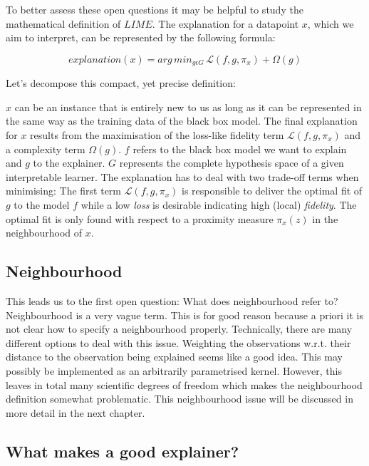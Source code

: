 \documentclass[]{krantz}
\begin{document}
To better assess these open questions it may be helpful to study the
mathematical definition of \(LIME\). The explanation for a datapoint
\(x\), which we aim to interpret, can be represented by the following
formula:

\[explanation\left(x\right) = arg\,min_{g \epsilon G} \,\mathcal{L}\left(f, g, \pi_x \right) + \Omega\left(g\right)\]

Let's decompose this compact, yet precise definition:

\(x\) can be an instance that is entirely new to us as long as it can be
represented in the same way as the training data of the black box model.
The final explanation for \(x\) results from the maximisation of the
loss-like fidelity term \(\mathcal{L}\left(f, g, \pi_x \right)\) and a
complexity term \(\Omega\left(g\right)\). \(f\) refers to the black box
model we want to explain and \(g\) to the explainer. \(G\) represents
the complete hypothesis space of a given interpretable learner. The
explanation has to deal with two trade-off terms when minimising: The
first term \(\mathcal{L}\left(f, g, \pi_x \right)\) is responsible to
deliver the optimal fit of \(g\) to the model \(f\) while a low
\emph{loss} is desirable indicating high (local) \emph{fidelity}. The
optimal fit is only found with respect to a proximity measure
\(\pi_x(z)\) in the neighbourhood of \(x\).

\subsection{Neighbourhood}\label{neighbourhood}

This leads us to the first open question: What does neighbourhood refer
to? Neighbourhood is a very vague term. This is for good reason because
a priori it is not clear how to specify a neighbourhood properly.
Technically, there are many different options to deal with this issue.
Weighting the observations w.r.t. their distance to the observation
being explained seems like a good idea. This may possibly be implemented
as an arbitrarily parametrised kernel. However, this leaves in total
many scientific degrees of freedom which makes the neighbourhood
definition somewhat problematic. This neighbourhood issue will be
discussed in more detail in the next chapter.

\subsection{What makes a good
explainer?}\label{what-makes-a-good-explainer}
\end{document}
